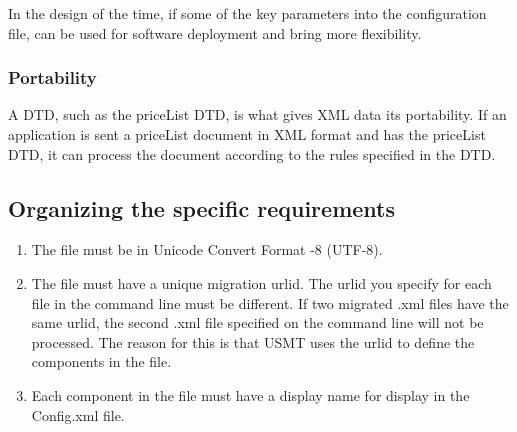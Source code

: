 In the design of the time, if some of the key parameters into the configuration file, can be used for software deployment and bring more flexibility.

\subsubsection{Portability}

A DTD, such as the priceList DTD, is what gives XML data its portability.
If an application is sent a priceList document in XML format and has the priceList DTD, 
it can process the document according to the rules specified in the DTD.

\subsection{Organizing the specific requirements}

\begin{enumerate}
    \item The file must be in Unicode Convert Format -8 (UTF-8).
    \item {
      The file must have a unique migration urlid.
      The urlid you specify for each file in the command line must be different.
      If two migrated .xml files have the same urlid, the second .xml file specified on the command line will not be processed.
      The reason for this is that USMT uses the urlid to define the components in the file.
    }
    \item Each component in the file must have a display name for display in the Config.xml file.
\end{enumerate}


